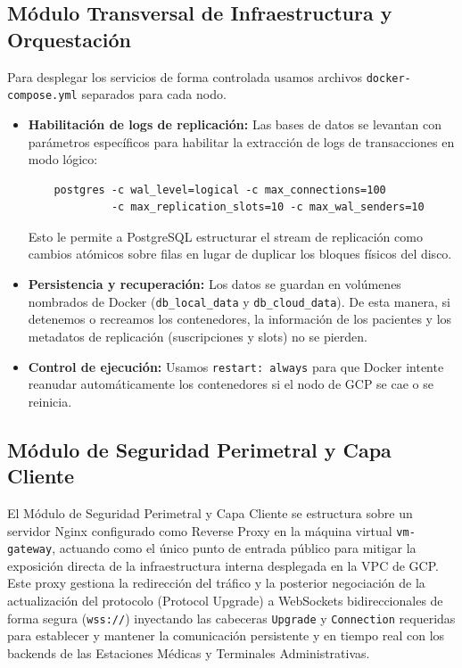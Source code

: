 \documentclass[11pt,a4paper]{article}
\begin{document}
\subsection{Módulo Transversal de Infraestructura y Orquestación}
Para desplegar los servicios de forma controlada usamos archivos \texttt{docker-compose.yml} separados para cada nodo.
\begin{itemize}
    \item \textbf{Habilitación de logs de replicación:} Las bases de datos se levantan con parámetros específicos para habilitar la extracción de logs de transacciones en modo lógico:
    \begin{verbatim}
    postgres -c wal_level=logical -c max_connections=100
             -c max_replication_slots=10 -c max_wal_senders=10
    \end{verbatim}
    Esto le permite a PostgreSQL estructurar el stream de replicación como cambios atómicos sobre filas en lugar de duplicar los bloques físicos del disco.
    \item \textbf{Persistencia y recuperación:} Los datos se guardan en volúmenes nombrados de Docker (\texttt{db\_local\_data} y \texttt{db\_cloud\_data}). De esta manera, si detenemos o recreamos los contenedores, la información de los pacientes y los metadatos de replicación (suscripciones y slots) no se pierden.
    \item \textbf{Control de ejecución:} Usamos \texttt{restart: always} para que Docker intente reanudar automáticamente los contenedores si el nodo de GCP se cae o se reinicia.
\end{itemize}

\subsection{Módulo de Seguridad Perimetral y Capa Cliente}
El Módulo de Seguridad Perimetral y Capa Cliente se estructura sobre un servidor Nginx configurado como Reverse Proxy en la máquina virtual \texttt{vm-gateway}, actuando como el único punto de entrada público para mitigar la exposición directa de la infraestructura interna desplegada en la VPC de GCP. Este proxy gestiona la redirección del tráfico y la posterior negociación de la actualización del protocolo (Protocol Upgrade) a WebSockets bidireccionales de forma segura (\texttt{wss://}) inyectando las cabeceras \texttt{Upgrade} y \texttt{Connection} requeridas para establecer y mantener la comunicación persistente y en tiempo real con los backends de las Estaciones Médicas y Terminales Administrativas.
\end{document}
